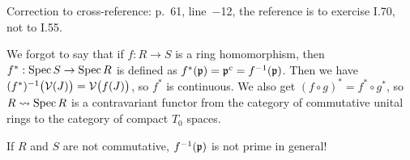  \setcounter{lecture}{20}

 Correction to cross-reference: p.~61, line~$-$12, the reference is to exercise I.70, not
 to I.55.

 We forgot to say that if $f:R\to S$ is a ring homomorphism, then $f^*:\operatorname{Spec} S\to \operatorname{Spec}
 R$ is defined as $f^*(\mathfrak{p})=\mathfrak{p}^c=f^{-1}(\mathfrak{p})$. Then we have $(f^*)^{-1}\bigl(
 \mathcal{V}(J)\bigr)=\mathcal{V}\bigl(f(J)\bigr)$, so $f^*$ is continuous. We also get $(f\circ
 g)^*=f^*\circ g^*$, so $R\rightsquigarrow \operatorname{Spec} R$ is a contravariant functor from
 the category of commutative unital rings to the category of compact $T_0$ spaces.

 \begin{remark}
   If $R$ and $S$ are not commutative, $f^{-1}(\mathfrak{p})$ is not prime in general!
 \end{remark}


